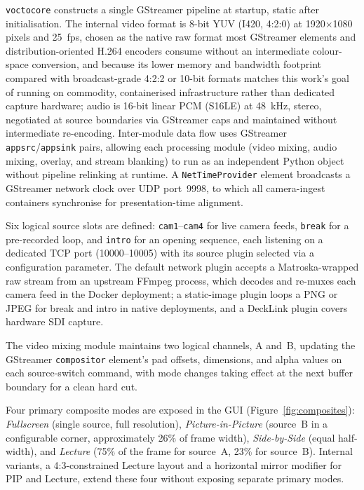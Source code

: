\documentclass[electronics,article,submit,pdftex,moreauthors]{Definitions/mdpi}
\begin{document}
\texttt{voctocore} constructs a single GStreamer pipeline at startup, static after initialisation.
The internal video format is 8-bit YUV (I420, 4:2:0) at 1920$\times$1080 pixels and 25~fps, chosen as the native raw format most GStreamer elements and distribution-oriented H.264 encoders consume without an intermediate colour-space conversion, and because its lower memory and bandwidth footprint compared with broadcast-grade 4:2:2 or 10-bit formats matches this work's goal of running on commodity, containerised infrastructure rather than dedicated capture hardware; audio is 16-bit linear PCM (S16LE) at 48~kHz, stereo, negotiated at source boundaries via GStreamer caps and maintained without intermediate re-encoding. Inter-module data flow uses GStreamer \texttt{appsrc}/\texttt{appsink} pairs, allowing each processing module (video mixing, audio mixing, overlay, and stream blanking) to run as an independent Python object without pipeline relinking at runtime. A \texttt{NetTimeProvider} element broadcasts a GStreamer network clock over UDP port~9998, to which all camera-ingest containers synchronise for presentation-time alignment.


Six logical source slots are defined: \texttt{cam1}--\texttt{cam4} for live camera feeds, \texttt{break} for a pre-recorded loop, and \texttt{intro} for an opening sequence, each listening on a dedicated TCP port (10000--10005) with its source plugin selected via a configuration parameter. The default network plugin accepts a Matroska-wrapped raw stream from an upstream FFmpeg process, which decodes and re-muxes each
camera feed in the Docker deployment; a static-image plugin loops a PNG or JPEG for break and intro in native deployments, and a DeckLink plugin covers hardware SDI capture.


The video mixing module maintains two logical channels, A and~B, updating the GStreamer \texttt{compositor} element's pad offsets, dimensions, and alpha values on each source-switch command, with mode changes taking effect at the next buffer boundary for a clean hard cut.

Four primary composite modes are exposed in the GUI (Figure~\ref{fig:composites}): \textit{Fullscreen} (single source, full resolution), \textit{Picture-in-Picture} (source~B in a configurable corner, approximately 26\% of frame width), \textit{Side-by-Side} (equal half-width), and \textit{Lecture} (75\% of the
frame for source~A, 23\% for source~B). Internal variants, a 4:3-constrained Lecture layout and a horizontal mirror modifier for PIP and Lecture, extend these four without exposing separate primary modes.
\end{document}
